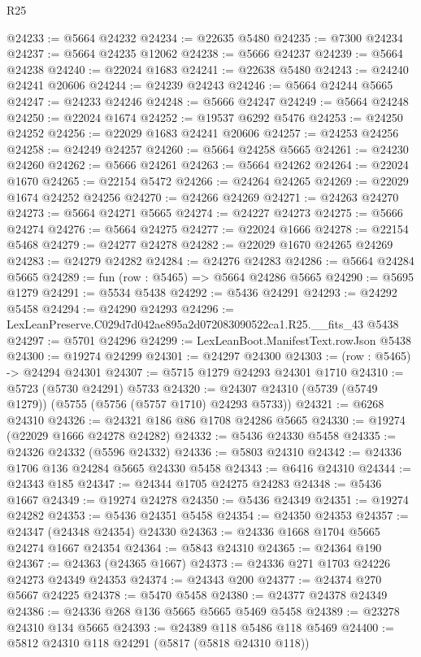 \begin{lexlean}{R25}
\begin{coremodule}
@24233 := @5664 @24232
@24234 := @22635 @5480
@24235 := @7300 @24234
@24237 := @5664 @24235 @12062
@24238 := @5666 @24237
@24239 := @5664 @24238
@24240 := @22024 @1683
@24241 := @22638 @5480
@24243 := @24240 @24241 @20606
@24244 := @24239 @24243
@24246 := @5664 @24244 @5665
@24247 := @24233 @24246
@24248 := @5666 @24247
@24249 := @5664 @24248
@24250 := @22024 @1674
@24252 := @19537 @6292 @5476
@24253 := @24250 @24252
@24256 := @22029 @1683 @24241 @20606
@24257 := @24253 @24256
@24258 := @24249 @24257
@24260 := @5664 @24258 @5665
@24261 := @24230 @24260
@24262 := @5666 @24261
@24263 := @5664 @24262
@24264 := @22024 @1670
@24265 := @22154 @5472
@24266 := @24264 @24265
@24269 := @22029 @1674 @24252 @24256
@24270 := @24266 @24269
@24271 := @24263 @24270
@24273 := @5664 @24271 @5665
@24274 := @24227 @24273
@24275 := @5666 @24274
@24276 := @5664 @24275
@24277 := @22024 @1666
@24278 := @22154 @5468
@24279 := @24277 @24278
@24282 := @22029 @1670 @24265 @24269
@24283 := @24279 @24282
@24284 := @24276 @24283
@24286 := @5664 @24284 @5665
@24289 := fun (row : @5465) => @5664 @24286 @5665
@24290 := @5695 @1279
@24291 := @5534 @5438
@24292 := @5436 @24291
@24293 := @24292 @5458
@24294 := @24290 @24293
@24296 := LexLeanPreserve.C029d7d042ae895a2d072083090522ca1.R25.__fits_43 @5438
@24297 := @5701 @24296
@24299 := LexLeanBoot.ManifestText.rowJson @5438
@24300 := @19274 @24299
@24301 := @24297 @24300
@24303 := (row : @5465) -> @24294 @24301
@24307 := @5715 @1279 @24293 @24301 @1710
@24310 := @5723 (@5730 @24291) @5733
@24320 := @24307 @24310 (@5739 (@5749 @1279)) (@5755 (@5756 (@5757 @1710) @24293 @5733))
@24321 := @6268 @24310
@24326 := @24321 @186 @86 @1708 @24286 @5665
@24330 := @19274 (@22029 @1666 @24278 @24282)
@24332 := @5436 @24330 @5458
@24335 := @24326 @24332 (@5596 @24332)
@24336 := @5803 @24310
@24342 := @24336 @1706 @136 @24284 @5665 @24330 @5458
@24343 := @6416 @24310
@24344 := @24343 @185
@24347 := @24344 @1705 @24275 @24283
@24348 := @5436 @1667
@24349 := @19274 @24278
@24350 := @5436 @24349
@24351 := @19274 @24282
@24353 := @5436 @24351 @5458
@24354 := @24350 @24353
@24357 := @24347 (@24348 @24354) @24330
@24363 := @24336 @1668 @1704 @5665 @24274 @1667 @24354
@24364 := @5843 @24310
@24365 := @24364 @190
@24367 := @24363 (@24365 @1667)
@24373 := @24336 @271 @1703 @24226 @24273 @24349 @24353
@24374 := @24343 @200
@24377 := @24374 @270 @5667 @24225
@24378 := @5470 @5458
@24380 := @24377 @24378 @24349
@24386 := @24336 @268 @136 @5665 @5665 @5469 @5458
@24389 := @23278 @24310 @134 @5665
@24393 := @24389 @118 @5486 @118 @5469
@24400 := @5812 @24310 @118 @24291 (@5817 (@5818 @24310 @118))

\end{coremodule}
\end{lexlean}
